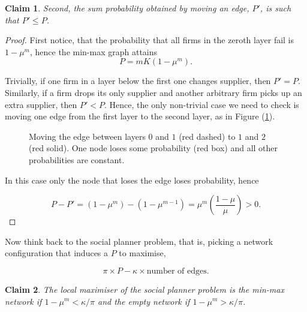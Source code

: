 \documentclass[american, abstract=on]{scrartcl}
\newcommand{\inputTikZ}[2]{%
    \scalebox{#1}{}  
    }
\theoremstyle{plain}
\newtheorem{claim}{Claim}
\begin{document}
\begin{claim} \label{claim:min-max:second}
    Second, the sum probability obtained by moving an edge, $P'$, is such that $P' \leq P$.
\end{claim}
\begin{proof}
    First notice, that the probability that all firms in the zeroth layer fail is $1 - \mu^m$, hence the min-max graph attains
    \begin{equation}
        P = m K (1 - \mu^{m}).
    \end{equation}

    Trivially, if one firm in a layer below the first one changes supplier, then $P' = P$. Similarly, if a firm drops its only supplier and another arbitrary firm picks up an extra supplier, then $P' < P$. Hence, the only non-trivial case we need to check is moving one edge from the first layer to the second layer, as in Figure (\ref{fig:min-max-moving-edge}). 
    
    \begin{figure}[H]
        \centering
        \inputTikZ{0.6}{../diagrams/min-max-moving-edge.tikz}
        \caption{Moving the edge between layers $0$ and $1$ (red dashed) to $1$ and $2$ (red solid). One node loses some probability (red box) and all other probabilities are constant.} \label{fig:min-max-moving-edge} 
    \end{figure} 

    In this case only the node that loses the edge loses probability, hence

    \begin{equation}
        P - P' = (1 - \mu^m) - (1 - \mu^{m-1}) = \mu^m \left(\frac{1 - \mu}{\mu}\right) > 0.
    \end{equation}
\end{proof}

Now think back to the social planner problem, that is, picking a network configuration that induces a $P$ to maximise,

\begin{equation}
    \pi \times P - \kappa \times \text{number of edges}.
\end{equation}

\begin{claim}
    The local maximiser of the social planner problem is the min-max network if $1 - \mu^m < \kappa / \pi$ and the empty network if $1 - \mu^m > \kappa / \pi$.
\end{claim}
\end{document}

